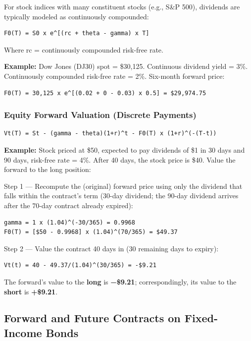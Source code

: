 \documentclass[12pt,openany]{book}
\theoremstyle{definition}
\theoremstyle{remark}
\begin{document}
For stock indices with many constituent stocks (e.g., S\&P 500), dividends are typically modeled as continuously compounded:

\begin{lstlisting}[style=notesCode]
F0(T) = S0 x e^[(rc + theta - gamma) x T]
\end{lstlisting}
Where rc = continuously compounded risk-free rate.

\textbf{Example:} Dow Jones (DJ30) spot = \$30,125. Continuous dividend yield = 3\%. Continuously compounded risk-free rate = 2\%. Six-month forward price:
\begin{lstlisting}[style=notesCode]
F0(T) = 30,125 x e^[(0.02 + 0 - 0.03) x 0.5] = $29,974.75
\end{lstlisting}

\subsubsection{Equity Forward Valuation (Discrete Payments)}

\begin{lstlisting}[style=notesCode]
Vt(T) = St - (gamma - theta)(1+r)^t - F0(T) x (1+r)^(-(T-t))
\end{lstlisting}

\textbf{Example:} Stock priced at \$50, expected to pay dividends of \$1 in 30 days and 90 days, risk-free rate = 4\%. After 40 days, the stock price is \$40. Value the forward to the long position:

Step 1 — Recompute the (original) forward price using only the dividend that falls within the contract's term (30-day dividend; the 90-day dividend arrives after the 70-day contract already expired):
\begin{lstlisting}[style=notesCode]
gamma = 1 x (1.04)^(-30/365) = 0.9968
F0(T) = [$50 - 0.9968] x (1.04)^(70/365) = $49.37
\end{lstlisting}
Step 2 — Value the contract 40 days in (30 remaining days to expiry):
\begin{lstlisting}[style=notesCode]
Vt(t) = 40 - 49.37/(1.04)^(30/365) = -$9.21
\end{lstlisting}
The forward's value to the \textbf{long} is \textbf{−\$9.21}; correspondingly, its value to the \textbf{short} is \textbf{+\$9.21}.

\subsection{Forward and Future Contracts on Fixed-Income Bonds}
\end{document}
